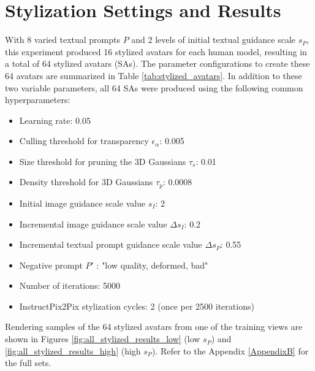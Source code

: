 \section{Stylization Settings and Results} \label{sec:stylization_settings}

With 8 varied textual prompts $P$ and 2 levels of initial textual guidance scale $s_P$, this experiment produced 16 stylized avatars for each human model, resulting in a total of 64 stylized avatars (SAs). The parameter configurations to create these 64 avatars are summarized in Table \ref{tab:stylized_avatars}. In addition to these two variable parameters, all 64 SAs were produced using the following common hyperparameters:

\begin{itemize}[noitemsep]
	\item Learning rate: 0.05
	\item Culling threshold for transparency $\epsilon_\alpha$: 0.005
	\item Size threshold for pruning the 3D Gaussians $\tau_s$: 0.01
	\item Density threshold for 3D Gaussians $\tau_p$: 0.0008
	\item Initial image guidance scale value $s_I$: 2
	\item Incremental image guidance scale value $\Delta s_I$: 0.2
	\item Incremental textual prompt guidance scale value $\Delta s_P$: 0.55
	\item Negative prompt $P'$ : "low quality, deformed, bad"
	\item Number of iterations: 5000
	\item InstructPix2Pix stylization cycles: 2 (once per 2500 iterations)
\end{itemize}

Rendering samples of the 64 stylized avatars from one of the training views are shown in Figures \ref{fig:all_stylized_results_low} (low $s_P$) and \ref{fig:all_stylized_results_high} (high $s_P$). Refer to the Appendix \ref{AppendixB} for the full sets.

